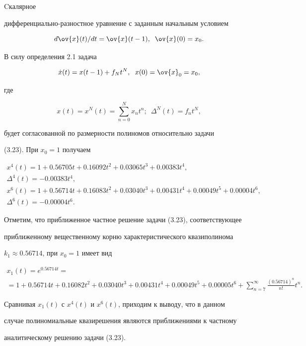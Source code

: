 \begin{exams}


Cкалярное


дифференциаль\-но-разностное уравнение с заданным начальным условием


\begin{equation}


d\ov{x}(t)/dt=\ov{x}(t-1),\;\; \ov{x}(0)=x_0.


\end{equation}


В силу определения 2.1 задача


$$


\Dot{x}(t)=x(t-1)+f_{N}t^{N},\ \; x(0)=\ov{x}_0=x_0,


$$


где


$$


x(t)=x^N(t)=\sum_{n=0}^{N}x_nt^n;\ \;\Delta^N(t)=f_nt^N,


$$


будет согласованной по размерности полиномов относительно задачи


(3.23). При $x_0=1$ получаем


\begin{gather*}


x^4(t)=1+0.56705t+0.16092t^2+0.03065t^3+0.00383t^4,\\


\Delta^4(t)=-0.00383t^4, \\


x^6(t)=1+0.56714t+0.16083t^2+0.03040t^3+0.00431t^4+


0.00049t^5+0.00004t^6,\\


\Delta^6(t)=-0.00004t^6.


\end{gather*}





Отметим, что приближенное частное решение задачи (3.23), соответствующее


приближенному вещественному корню характеристического квазиполинома


$k_1\approx 0.56714$, при $x_0=1$ имеет вид


\begin{multline*}


x_1(t)=e^{0.56714t}= \\


=1+0.56714t+0.16082t^2+0.03040t^3+0.00431t^4+


0.00049t^5+0.00005t^6+


\sum_{n=7}^{\infty}\frac{(0.56714)^n}{n!}t^n.


\end{multline*}





Сравнивая $x_1(t)$ с $x^4(t)$ и $x^6(t)$, приходим к выводу, что в данном


случае полиномиальные квазирешения являются приближениями к частному


аналитическому решению задачи (3.23).


\end{exams}

